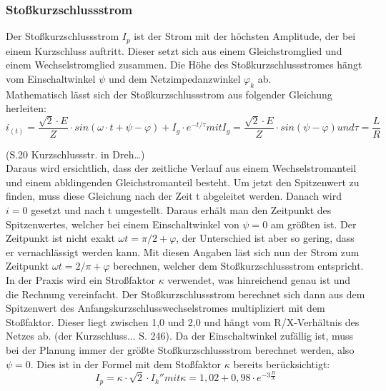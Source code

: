 \documentclass{scrartcl}
\begin{document}
\begin{onehalfspace}
\subsubsection{Stoßkurzschlussstrom}
Der Stoßkurzschlussstrom $I_p$ ist der Strom mit der höchsten Amplitude, der bei einem Kurzschluss auftritt. Dieser setzt sich aus einem Gleichstromglied und einem Wechselstromglied zusammen. Die Höhe des Stoßkurzschlussstromes hängt vom Einschaltwinkel $\psi$ und dem Netzimpedanzwinkel $\varphi_k$ ab. \\
Mathematisch lässt sich der Stoßkurzschlussstrom aus folgender Gleichung herleiten: \\

\begin{equation}
i_{(t)} = \frac{\sqrt{2} \cdot E}{Z} \cdot sin(\omega \cdot t + \psi - \varphi) + I_g \cdot e^{-t/\tau} 
mit I_g = \frac{\sqrt{2} \cdot E}{Z} \cdot sin( \psi -  \varphi) und \tau = \frac{L}{R}
\end{equation}

(S.20 Kurzschlussstr. in Dreh…)\\
Daraus wird ersichtlich, dass der zeitliche Verlauf aus einem Wechselstromanteil und einem abklingenden Gleichstromanteil besteht. Um jetzt den Spitzenwert zu finden, muss diese Gleichung nach der Zeit t abgeleitet werden. Danach wird $i = 0$ gesetzt und nach t umgestellt. Daraus erhält man den Zeitpunkt des Spitzenwertes, welcher bei einem Einschaltwinkel von $\psi = 0$ am größten ist. Der Zeitpunkt ist nicht exakt $\omega t = \pi/2 + \varphi$, der Unterschied ist aber so gering, dass er vernachlässigt werden kann. Mit diesen Angaben läst sich nun der Strom zum Zeitpunkt $\omega t = 2/\pi + \varphi$ berechnen, welcher dem Stoßkurzschlussstrom entspricht.\\
In der Praxis wird ein Stroßfaktor $\kappa$ verwendet, was hinreichend genau ist und die Rechnung vereinfacht.
Der Stoßkurzschlussstrom berechnet sich dann aus dem Spitzenwert des Anfangskurzschlusswechselstromes multipliziert mit dem Stoßfaktor. Dieser liegt zwischen 1,0 und 2,0 und hängt vom R/X-Verhältnis des Netzes ab. (der Kurzschluss... S. 246).
 Da der Einschaltwinkel zufällig ist, muss bei der Planung immer der größte Stoßkurzschlussstrom berechnet werden, also $\psi = 0$. Dies ist in der Formel mit dem Stoßfaktor $\kappa$ bereits berücksichtigt: \\

\begin{equation}
I_p = \kappa \cdot \sqrt{2} \cdot I_k'' mit \kappa = 1,02 + 0,98 \cdot e^{-3 \frac{R}{X}}
\end{equation}


\end{onehalfspace}
\end{document}
